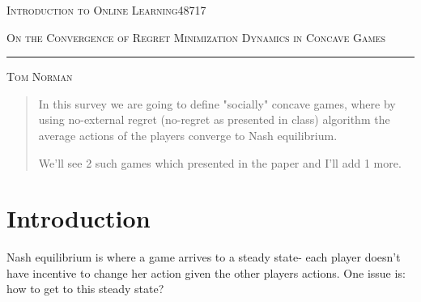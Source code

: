 \documentclass[11pt]{article}
\theoremstyle{definition}
\theoremstyle{definition}
\begin{document}
\noindent
\begin{minipage}[t]{1\columnwidth}%
\textsc{Introduction to Online Learning}\hspace*{\fill}48717
\vspace{2mm}

\textsc{On the Convergence of Regret Minimization Dynamics in Concave
Games}

\noindent \rule[0.5ex]{1\linewidth}{1pt}

\textsc{Tom Norman}
\vspace{10mm}
\end{minipage}






\newcommand{\pr}[1]{\left( #1 \right)}
\newcommand{\spr}[1]{\left\{ #1 \right\}}
\newcommand{\mpr}[1]{\left[ #1 \right]}
\newcommand{\set}[4]{\spr{#1}_{#2=#3}^{#4}}
\newcommand{\defi}[1]{\text{Definition }\ref{#1}}
\newcommand{\lemi}[1]{\text{Lemma }\ref{#1}}
\newcommand{\thei}[1]{\text{Theorem }\ref{#1}}
\newcommand{\equi}[1]{\text{Equation }(\ref{#1})}
\newcommand{\fracc}[1]{\frac{1}{#1}}
\newcommand{\ene}[1]{\epsilon^{#1}\text{-Nash equilibrium}}
\newcommand{\ebr}[1]{\epsilon^{#1}\text{-best response}}

\def\game{G = \pr{N, \set{S_i}{i}{1}{n}, \set{u_i}{i}{1}{n}}}
\def\li{\lambda_i}
\def\lj{\lambda_j}



\begin{abstract}
	In this survey we are going to define "socially" concave games, where by using no-external regret (no-regret as presented in class) algorithm the average actions of the players converge to Nash equilibrium.

	We'll see 2 such games which presented in the paper and I'll add 1 more.
\end{abstract}


\section{Introduction}

Nash equilibrium is where a game arrives to a steady state- each player doesn't have incentive to change her action given the other players actions. One issue is: how to get to this steady state?
\end{document}
